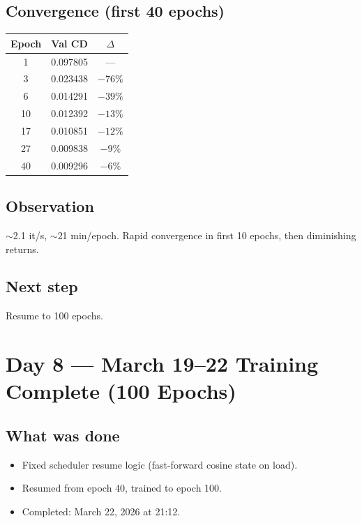 \documentclass[10pt,a4paper]{article}
\begin{document}
\subsection*{Convergence (first 40 epochs)}
\begin{center}
\begin{tabular}{ccc}
\toprule
\textbf{Epoch} & \textbf{Val CD} & \textbf{$\Delta$} \\
\midrule
1  & 0.097805 & --- \\
3  & 0.023438 & $-76\%$ \\
6  & 0.014291 & $-39\%$ \\
10 & 0.012392 & $-13\%$ \\
17 & 0.010851 & $-12\%$ \\
27 & 0.009838 & $-9\%$ \\
40 & 0.009296 & $-6\%$ \\
\bottomrule
\end{tabular}
\end{center}

\subsection*{Observation}
$\sim$2.1 it/s, $\sim$21 min/epoch. Rapid convergence in first 10 epochs, then diminishing returns.

\subsection*{Next step}
Resume to 100 epochs.

\section*{Day 8 --- March 19--22 \hfill \normalfont\small Training Complete (100 Epochs)}

\subsection*{What was done}
\begin{itemize}[nosep]
    \item Fixed scheduler resume logic (fast-forward cosine state on load).
    \item Resumed from epoch 40, trained to epoch 100.
    \item Completed: March 22, 2026 at 21:12.
\end{itemize}
\end{document}
